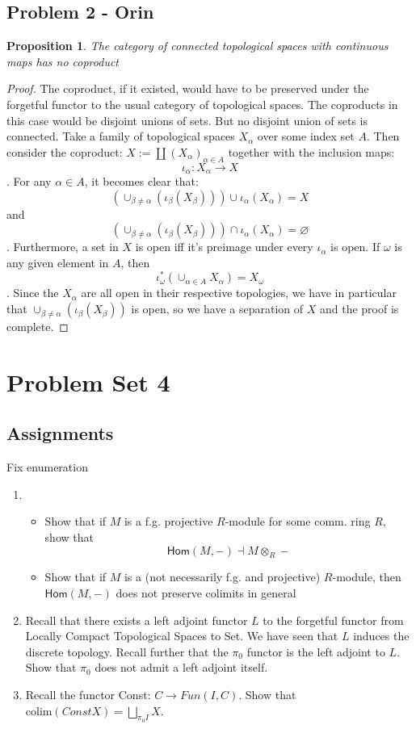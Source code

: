 \documentclass{article}
\newtheorem{proposition}[subsection]{Proposition}
\begin{document}
\subsection{Problem 2 - Orin}
\begin{proposition}
	The category of connected topological spaces with continuous maps has no coproduct
\end{proposition}
\begin{proof}
	The coproduct, if it existed, would have to be preserved under the forgetful functor to the usual category of topological spaces.  The coproducts in this case would be disjoint unions of sets.  But no disjoint union of sets is connected.  Take a family of topological spaces $X_\alpha$ over some index set $A$.  Then consider the coproduct: $X := \coprod(X_\alpha)_{\alpha\in A}$ together with the inclusion maps: $$\iota_\alpha: X_\alpha\to X$$.  For any $\alpha\in A$, it becomes clear that:
	$$(\cup_{\beta\neq\alpha}(\iota_\beta(X_\beta)))\cup \iota_\alpha(X_\alpha) = X$$ and
	$$(\cup_{\beta\neq\alpha}(\iota_\beta(X_\beta)))\cap \iota_\alpha(X_\alpha) = \varnothing$$.  Furthermore, a set in $X$ is open iff it's preimage under every $\iota_\alpha$ is open.  If $\omega$ is any given element in $A$, then
	$$\iota_\omega^*(\cup_{\alpha\in A}X_\alpha)=X_\omega$$. Since the $X_\alpha$ are all open in their respective topologies, we have in particular that $\cup_{\beta\neq\alpha}(\iota_\beta(X_\beta))$ is open, so we have a separation of $X$ and the proof is complete.
\end{proof}
\section{Problem Set 4}
\subsection{Assignments}
\alert{Fix enumeration}
\begin{enumerate}
	\item \begin{itemize}[a.]
		\item Show that if $M$ is a f.g. projective $R$-module for some comm. ring $R$, show that $$\textsf{Hom}(M,-)\dashv M\otimes_R -$$
		\item Show that if $M$ is a (not necessarily f.g. and projective) $R$-module, then $\textsf{Hom}(M,-)$ does not preserve colimits in general
	\end{itemize}
	\item Recall that there exists a left adjoint functor $L$ to the forgetful functor from Locally Compact Topological Spaces to Set. We have seen that $L$ induces the discrete topology. Recall further that the $\pi_0$ functor is the left adjoint to $L$. Show that $\pi_0$ does not admit a left adjoint itself.
	\item Recall the functor Const: $C\to Fun(I,C)$. Show that $\text{colim}(Const X) = \bigsqcup_{\pi_0 I}X$.
\end{enumerate}


\end{document}
